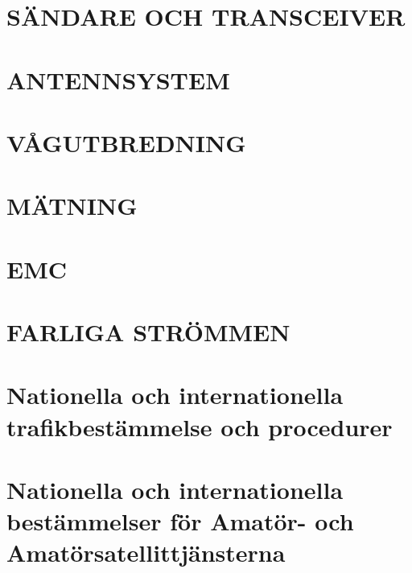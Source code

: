 \documentclass[a4paper,twoside,twocolumn,openright]{book}
\begin{document}
\chapter{SÄNDARE OCH TRANSCEIVER}



\chapter{ANTENNSYSTEM}







\chapter{VÅGUTBREDNING}






\chapter{MÄTNING}



\chapter{EMC}





\chapter{FARLIGA STRÖMMEN}







\chapter{Nationella och internationella trafikbestämmelse och procedurer}







\chapter{Nationella och internationella bestämmelser för Amatör- och
  Amatörsatellittjänsterna}



\end{document}
